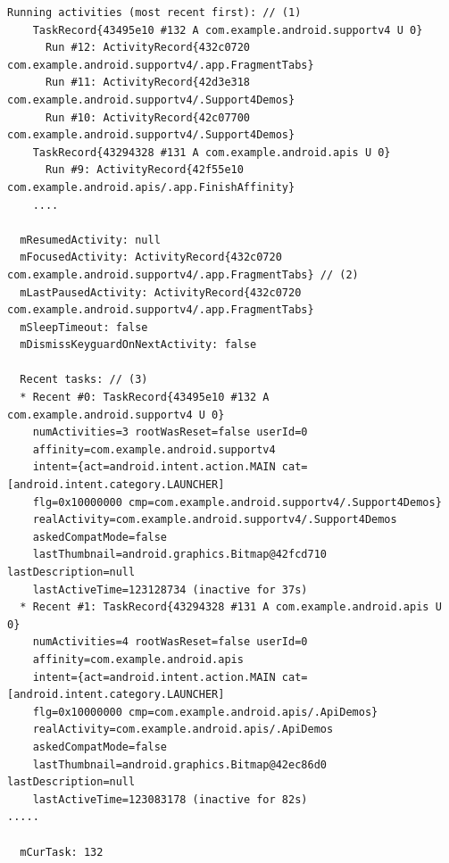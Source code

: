 \begin{lstlisting}[frame=single]
  Running activities (most recent first): // (1)
    TaskRecord{43495e10 #132 A com.example.android.supportv4 U 0}
      Run #12: ActivityRecord{432c0720 com.example.android.supportv4/.app.FragmentTabs}
      Run #11: ActivityRecord{42d3e318 com.example.android.supportv4/.Support4Demos}
      Run #10: ActivityRecord{42c07700 com.example.android.supportv4/.Support4Demos}
    TaskRecord{43294328 #131 A com.example.android.apis U 0}
      Run #9: ActivityRecord{42f55e10 com.example.android.apis/.app.FinishAffinity}
	....
 
  mResumedActivity: null
  mFocusedActivity: ActivityRecord{432c0720 com.example.android.supportv4/.app.FragmentTabs} // (2)
  mLastPausedActivity: ActivityRecord{432c0720 com.example.android.supportv4/.app.FragmentTabs}
  mSleepTimeout: false
  mDismissKeyguardOnNextActivity: false

  Recent tasks: // (3)
  * Recent #0: TaskRecord{43495e10 #132 A com.example.android.supportv4 U 0}
    numActivities=3 rootWasReset=false userId=0
    affinity=com.example.android.supportv4
    intent={act=android.intent.action.MAIN cat=[android.intent.category.LAUNCHER] 
    flg=0x10000000 cmp=com.example.android.supportv4/.Support4Demos}
    realActivity=com.example.android.supportv4/.Support4Demos
    askedCompatMode=false
    lastThumbnail=android.graphics.Bitmap@42fcd710 lastDescription=null
    lastActiveTime=123128734 (inactive for 37s)
  * Recent #1: TaskRecord{43294328 #131 A com.example.android.apis U 0}
    numActivities=4 rootWasReset=false userId=0
    affinity=com.example.android.apis
    intent={act=android.intent.action.MAIN cat=[android.intent.category.LAUNCHER] 
    flg=0x10000000 cmp=com.example.android.apis/.ApiDemos}
    realActivity=com.example.android.apis/.ApiDemos
    askedCompatMode=false
    lastThumbnail=android.graphics.Bitmap@42ec86d0 lastDescription=null
    lastActiveTime=123083178 (inactive for 82s)
.....

  mCurTask: 132          
\end{lstlisting}
\lstset{basicstyle=\ttfamily\small}
